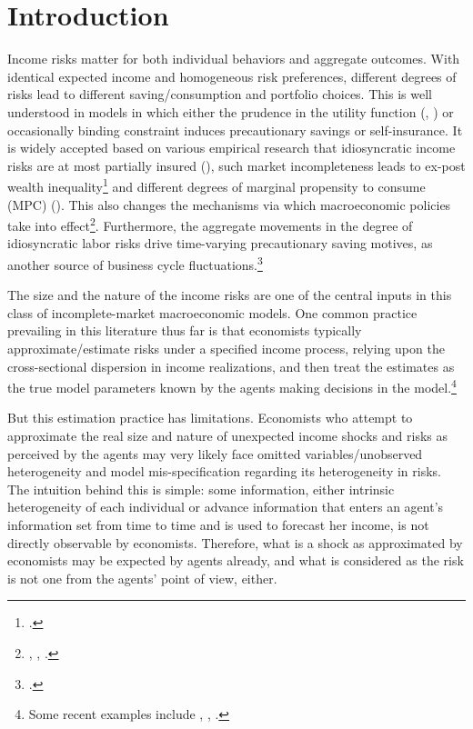 
    \hypertarget{introduction}{%
\section{Introduction}\label{introduction}}

Income risks matter for both individual behaviors and aggregate
outcomes. With identical expected income and homogeneous risk
preferences, different degrees of risks lead to different
saving/consumption and portfolio choices. This is well understood in
models in which either the prudence in the utility function
(\cite{kimball1990precautionary}, \cite{carroll2001liquidity}) or occasionally binding constraint induces precautionary
savings or self-insurance. It is widely accepted based on various empirical research that
idiosyncratic income risks are at most partially insured
(\cite{blundell_consumption_2008}), such market incompleteness leads
to ex-post wealth inequality\footnote{\cite{ aiyagari1994uninsured,huggett1996wealth,carroll1997nature,krusell1998income}.} and different degrees of marginal
propensity to consume (MPC) (\cite{krueger2016macroeconomics, carroll2017distribution}). This also changes the mechanisms via which macroeconomic policies take into effect\footnote{\cite{krueger2016macroeconomics}, \cite{kaplan2018monetary}, \cite{auclert2019monetary}.}. Furthermore, the aggregate movements in the degree of idiosyncratic labor risks drive time-varying precautionary saving motives, as another source of business cycle fluctuations.\footnote{ \cite{challe2016precautionary, mckay2017time,heathcote2018wealth, kaplan2018microeconomic,den2018unemployment,bayer2019precautionary, acharya2020understanding,ravn2021macroeconomic,harmenberg2021consumption}.}

The size and the nature of the income risks are one of the central inputs in this class of incomplete-market macroeconomic models. One common practice prevailing in this literature thus far is that economists typically approximate/estimate risks under a specified income process, relying upon the cross-sectional dispersion in income realizations, and then treat the estimates
as the true model parameters known by the agents making decisions in the
model.\footnote{Some recent examples include \cite{krueger2016macroeconomics}, \cite{bayer2019precautionary}, \cite{kaplan2018monetary}.}
  
  
But this estimation practice has limitations. Economists who attempt to approximate the real size and nature of unexpected income shocks and risks as perceived by the agents may very likely face omitted variables/unobserved heterogeneity and model mis-specification regarding its heterogeneity in risks. The intuition behind this is simple: some information, either intrinsic heterogeneity of each individual or advance information that enters an agent's information set from time to time and is used to forecast her income, is not directly observable by economists. Therefore, what is a shock as approximated by economists may be expected by agents already, and what is considered as the risk is not one from the agents' point of view, either.



